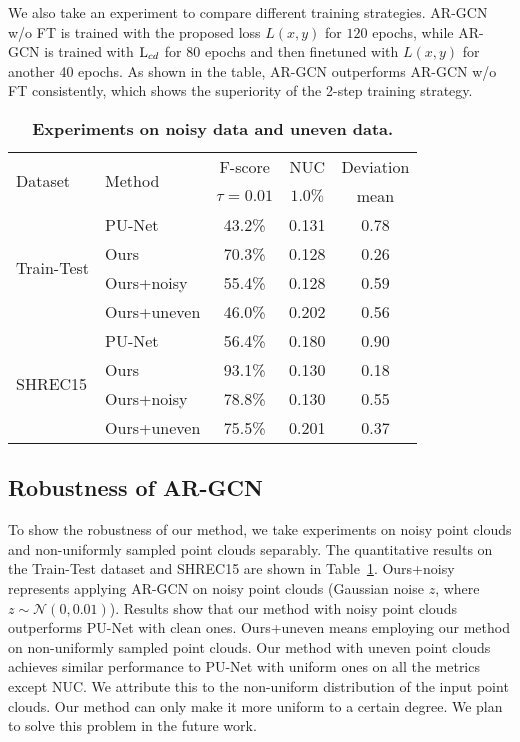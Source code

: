 \documentclass[10pt,twocolumn,letterpaper]{article}
\begin{document}
We also take an experiment to compare different training strategies.
AR-GCN w/o FT is trained with the proposed loss $L(x, y)$ for $120$ epochs, while AR-GCN is trained with $\textnormal{L}_{cd}$ for 80 epochs and then finetuned with $L(x, y)$ for another 40 epochs.
As shown in the table, AR-GCN outperforms AR-GCN w/o FT consistently, which shows the superiority of the 2-step training strategy.

\begin{table}[!t]
\small
\begin{center}
\begin{tabular}{l|l|c|c|c}
\hline
\multirow{2}{*}{Dataset} & \multirow{2}{*}{Method} & \multicolumn{1}{c}{F-score} & \multicolumn{1}{|c}{NUC} & \multicolumn{1}{|c}{Deviation}\\
\cline{3-5}
& & $\tau=0.01$ & $1.0\%$ & mean \\
\hline
\multirow{4}{*}{Train-Test} & PU-Net & 43.2\% & 0.131 & 0.78 \\
& Ours & 70.3\% & 0.128 & 0.26 \\
\cline{2-5}
& Ours+noisy & 55.4\% & 0.128 & 0.59 \\
\cline{2-5}
& Ours+uneven & 46.0\% & 0.202 & 0.56 \\
\hline
\hline
\multirow{4}{*}{SHREC15} & PU-Net & 56.4\% & 0.180 & 0.90 \\
& Ours & 93.1\% & 0.130 & 0.18 \\
\cline{2-5}
& Ours+noisy & 78.8\% & 0.130 & 0.55 \\
\cline{2-5}
& Ours+uneven & 75.5\% & 0.201 & 0.37 \\
\hline
\end{tabular}
\end{center}
	\vspace{-1.5em}
	\caption{\textbf{Experiments on noisy data and uneven data.}}
	\vspace{-1em}
	\label{table:noisy_uneven}
\end{table}

\subsection{Robustness of AR-GCN}
To show the robustness of our method, we take experiments on noisy point clouds and non-uniformly sampled point clouds separably.
The quantitative results on the Train-Test dataset and SHREC15 are shown in Table~\ref{table:noisy_uneven}.
Ours+noisy represents applying AR-GCN on noisy point clouds (Gaussian noise $z$, where $z\sim \mathcal{N}(0, 0.01)$).
Results show that our method with noisy point clouds outperforms PU-Net with clean ones.
Ours+uneven means employing our method on non-uniformly sampled point clouds.
Our method with uneven point clouds achieves similar performance to PU-Net with uniform ones on all the metrics except NUC.
We attribute this to the non-uniform distribution of the input point clouds.
Our method can only make it more uniform to a certain degree.
We plan to solve this problem in the future work.
\end{document}
